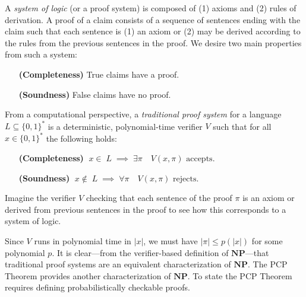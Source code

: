 \documentclass{article}
\newtheorem{definition}[theorem]{Definition}
\newcommand{\bits}{\{0,1\}}
\newcommand{\class}[1]{\mathbf{#1}}
\newcommand{\NP}{\class{NP}}
\begin{document}
A \emph{system of logic} (or a proof system) is composed of (1) axioms
and (2) rules of derivation.
A proof of a claim consists of a sequence of sentences ending with the claim
such that each sentence is (1) an axiom or (2) may be derived according to the rules
from the previous sentences in the proof.
We desire two main properties from such a system:
\begin{itemize}[leftmargin=10em]
\item[\textbf{(Completeness)}] True claims have a proof.
\item[\textbf{(Soundness)}] False claims have no proof.
\end{itemize}

%

From a computational perspective, a \emph{traditional proof system} for a
language $L \subseteq \bits^*$ is a deterministic, polynomial-time verifier $V$
such that for all $x \in \bits^*$ the following holds:
\begin{itemize}[leftmargin=10em]
\item[\textbf{(Completeness)}] $\;x \in\; L \;\implies\; \exists \pi \quad V(x, \pi) \text{ accepts}$.
\item[\textbf{(Soundness)}] $\;x \notin\; L \;\implies\; \forall \pi \quad V(x, \pi) \text{ rejects}$.
\end{itemize}
Imagine the verifier $V$ checking that each sentence of the proof $\pi$
is an axiom or derived from previous sentences in the proof to see how
this corresponds to a system of logic.

Since $V$ runs in polynomial time in $|x|$, we must have
$|\pi| \le p(|x|)$ for some polynomial $p$.
It is clear---from the verifier-based definition of $\NP$---that traditional proof
systems are an equivalent characterization of $\NP$.
The PCP Theorem provides another characterization of $\NP$.
To state the PCP Theorem requires defining probabilistically checkable proofs.
\end{document}
